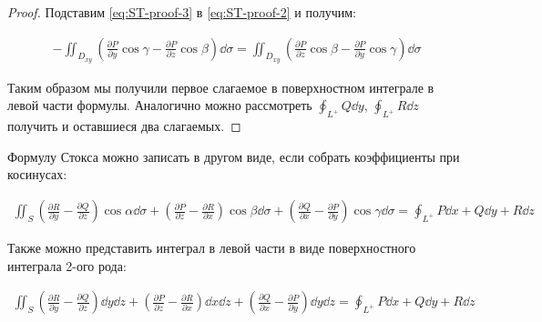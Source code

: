 \begin{proof}
  Подставим \eqref{eq:ST-proof-3} в \eqref{eq:ST-proof-2} и получим:

  \begin{align*}
    -\iint_{D_{xy}} \left(
      \frac{\partial P}{\partial y} \cos \gamma
      - \frac{\partial P}{\partial z} \cos \beta
    \right) \dd \sigma
    =
    \iint_{D_{xy}} \left(
      \frac{\partial P}{\partial z} \cos \beta
      - \frac{\partial P}{\partial y} \cos \gamma
    \right) \dd \sigma
  \end{align*}

  Таким образом мы получили первое слагаемое в поверхностном интеграле в левой
  части формулы. Аналогично можно рассмотреть
  \(\displaystyle \oint_{L^{+}} Q \dd y\),
  \(\displaystyle \oint_{L^{+}} R \dd z\)
  получить и оставшиеся два слагаемых.
\end{proof}

\begin{remark}
  Формулу Стокса можно записать в другом виде, если собрать коэффициенты при
  косинусах:

  \begin{align*}
    \iint_{S}
      \left(
        \frac{\partial R}{\partial y} 
        - \frac{\partial Q}{\partial z}
      \right) \cos \alpha \dd \sigma
      + \left(
        \frac{\partial P}{\partial z} 
        - \frac{\partial R}{\partial x}
      \right) \cos \beta \dd \sigma
      + \left(
        \frac{\partial Q}{\partial x} 
        - \frac{\partial P}{\partial y}
      \right) \cos \gamma \dd \sigma
    = \oint_{L^{+}} P \dd x + Q \dd y + R \dd z
  \end{align*}

  Также можно представить интеграл в левой части в виде поверхностного интеграла
  2-ого рода:

  \begin{align*}
    \iint_{S}
      \left(
        \frac{\partial R}{\partial y} 
        - \frac{\partial Q}{\partial z}
      \right) \dd y \dd z
      + \left(
        \frac{\partial P}{\partial z} 
        - \frac{\partial R}{\partial x}
      \right) \dd x \dd z
      + \left(
        \frac{\partial Q}{\partial x} 
        - \frac{\partial P}{\partial y}
      \right) \dd y \dd z
    = \oint_{L^{+}} P \dd x + Q \dd y + R \dd z
  \end{align*}
\end{remark}